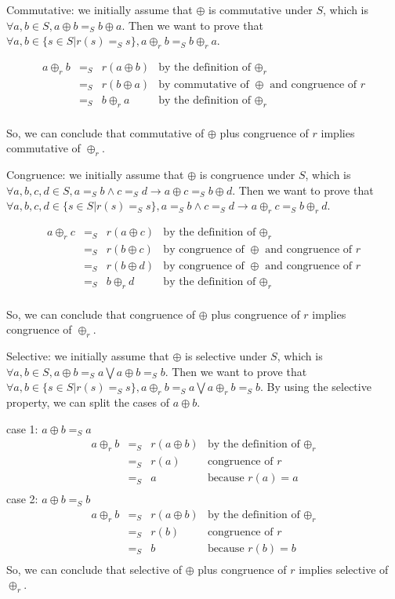 \documentclass[a4paper,12pt,twoside,openright]{report}
\newcommand{\e}[2]{
\begin{equation}
  \label{#1} 
  #2
\end{equation}
}
\begin{document}
Commutative: we initially assume that $\oplus$ is commutative under $S$, which is $\forall a,b \in S, a \oplus b =_S b \oplus a$. Then we want to prove that $\forall a,b \in \{s \in S | r(s) =_S s\}, a \oplus_r b =_S b \oplus_r a$.
\e{r:proof:commutative}{
\begin{array}{rcll} 
a \oplus_r b & =_S & r(a \oplus b) &\mbox{by the definition of $\oplus_r$} \\
			 & =_S & r(b \oplus a) &\mbox{by commutative of $\oplus$ and congruence of $r$}\\
             & =_S & b \oplus_r a &\mbox{by the definition of $\oplus_r$} \\
\end{array}}
So, we can conclude that commutative of $\oplus$ plus congruence of $r$ implies commutative of $\oplus_r$.

Congruence: we initially assume that $\oplus$ is congruence under $S$, which is $\forall a,b,c,d \in S, a =_S b \wedge c =_S d \rightarrow a \oplus c =_S b \oplus d$. Then we want to prove that $\forall a,b,c,d \in \{s \in S | r(s) =_S s\}, a =_S b \wedge c =_S d \rightarrow a \oplus_r c =_S b \oplus_r d$.
\e{r:proof:congruence}{
\begin{array}{rcll} 
a \oplus_r c & =_S & r(a \oplus c) &\mbox{by the definition of $\oplus_r$} \\
			 & =_S & r(b \oplus c) &\mbox{by congruence of $\oplus$ and congruence of $r$}\\
			 & =_S & r(b \oplus d) &\mbox{by congruence of $\oplus$ and congruence of $r$}\\
             & =_S & b \oplus_r d &\mbox{by the definition of $\oplus_r$} \\
\end{array}}
So, we can conclude that congruence of $\oplus$ plus congruence of $r$ implies congruence of $\oplus_r$.

Selective: we initially assume that $\oplus$ is selective under $S$, which is $\forall a,b \in S, a \oplus b =_S a \bigvee a \oplus b =_S b$. Then we want to prove that $\forall a,b \in \{s \in S | r(s) =_S s\}, a \oplus_r b =_S a \bigvee a \oplus_r b =_S b$. By using the selective property, we can split the cases of $a\oplus b$.

case 1: $a \oplus b =_S a$
\[
\begin{array}{rcll} 
a \oplus_r b & =_S & r(a \oplus b) &\mbox{by the definition of $\oplus_r$} \\
			 & =_S & r(a) &\mbox{congruence of $r$}\\
			 & =_S & a &\mbox{because $r(a) = a$}\\
\end{array}
\]
case 2: $a \oplus b =_S b$
\[
\begin{array}{rcll} 
a \oplus_r b & =_S & r(a \oplus b) &\mbox{by the definition of $\oplus_r$} \\
			 & =_S & r(b) &\mbox{congruence of $r$}\\
			 & =_S & b &\mbox{because $r(b) = b$}\\
\end{array}
\]
So, we can conclude that selective of $\oplus$ plus congruence of $r$ implies selective of $\oplus_r$.
\end{document}
